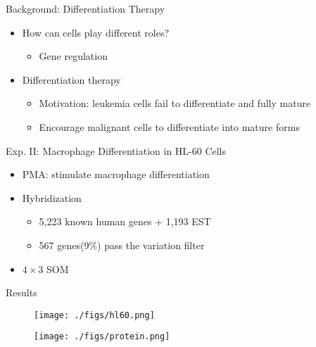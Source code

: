 \begin{frame}{Background: Differentiation Therapy}
    \begin{itemize}
        \item How can cells play different roles?
              \begin{itemize}
                  \item Gene regulation
              \end{itemize}
        \item Differentiation therapy
              \begin{itemize}
                  \item Motivation: leukemia cells fail to differentiate and fully mature
                  \item Encourage malignant cells to differentiate into mature forms
              \end{itemize}
    \end{itemize}
\end{frame}

\begin{frame}{Exp. II: Macrophage Differentiation in HL-60 Cells}
    \begin{itemize}
        \item PMA: stimulate macrophage differentiation
        \item Hybridization
              \begin{itemize}
                  \item 5,223 known human genes + 1,193 EST
                  \item 567 genes(9$\%$) pass the variation filter
              \end{itemize}
        \item $4\times 3$ SOM
    \end{itemize}
\end{frame}

\begin{frame}{Results}
    \begin{figure}
        \begin{minipage}[b]{0.48\linewidth}
            \centering
            \texttt{[image: ./figs/hl60.png]}
        \end{minipage}
        \begin{minipage}[b]{0.48\linewidth}
            \centering
            \texttt{[image: ./figs/protein.png]}
        \end{minipage}
    \end{figure}
\end{frame}

